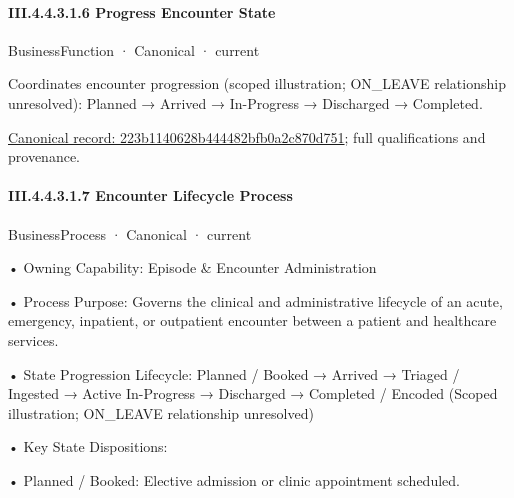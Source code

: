 \paragraph*{III.4.4.3.1.6 Progress Encounter State}
\label{navigation:III.4.4.3.1.6}

\label{element:223b1140628b444482bfb0a2c870d751}
{\small BusinessFunction · Canonical · current}\par

Coordinates encounter progression (scoped illustration; ON\_LEAVE relationship unresolved): Planned → Arrived → In-Progress → Discharged → Completed.


{\footnotesize \href{../../../../../../../../continuum/business/business-function/223b1140628b444482bfb0a2c870d751.md}{Canonical record: 223b1140628b444482bfb0a2c870d751}; full qualifications and provenance.}\par
\paragraph*{III.4.4.3.1.7 Encounter Lifecycle Process}
\label{navigation:III.4.4.3.1.7}

\label{element:df49e2e8bb3748f3abbdd1c28ae1be8f}
{\small BusinessProcess · Canonical · current}\par

•
Owning Capability: Episode \& Encounter Administration



•
Process Purpose: Governs the clinical and administrative lifecycle of an acute, emergency, inpatient, or outpatient encounter between a patient and healthcare services.



•
State Progression Lifecycle: Planned / Booked → Arrived → Triaged / Ingested → Active In-Progress → Discharged → Completed / Encoded   (Scoped illustration; ON\_LEAVE relationship unresolved)



•
Key State Dispositions:



•
Planned / Booked: Elective admission or clinic appointment scheduled.



